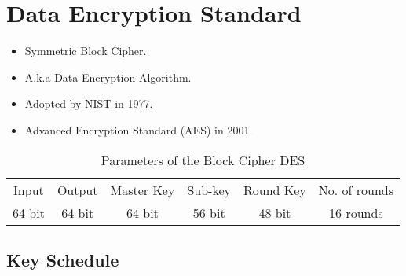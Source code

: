\chapter{Data Encryption Standard}

\begin{itemize}
	\item Symmetric Block Cipher.
	\item A.k.a Data Encryption Algorithm.
	\item Adopted by NIST in 1977.
	\item Advanced Encryption Standard (AES) in 2001.
\end{itemize}

\begin{table}[h!]\centering\renewcommand{\arraystretch}{1.25} %
\caption{Parameters of the Block Cipher DES}
\begin{tabular*}{\textwidth}{@{\extracolsep{\fill}}cccccc}
	\toprule[1.2pt]
	Input & Output & Master Key & Sub-key & Round Key & No. of rounds \\
	64-bit & 64-bit & 64-bit & 56-bit & 48-bit & 16 rounds \\
	\bottomrule[1.2pt]
\end{tabular*}
\end{table}

\section{Key Schedule}